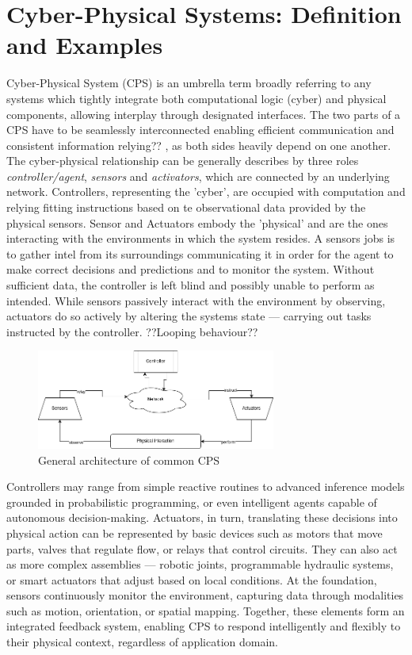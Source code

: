 \documentclass[11pt]{report}
\begin{document}
\section{Cyber-Physical Systems: Definition and Examples}

Cyber-Physical System (CPS) is an umbrella term broadly referring to any systems which tightly integrate both computational logic (cyber) and physical components, allowing interplay
through designated interfaces. \cite{cpsModelDesc} The two parts of a CPS have to be seamlessly interconnected enabling efficient communication and consistent information
 relying?? \cite{cpsChallengesAndFuture}, as both sides heavily depend on one another.
The cyber-physical relationship can be generally describes by three roles \textit{controller/agent}, \textit{sensors} and \textit{activators},
which are connected by an underlying network.
Controllers, representing the 'cyber', are occupied with computation and relying fitting instructions based on te observational data provided by the physical sensors.
Sensor and Actuators embody the 'physical' and are the ones interacting with the environments in which the system resides. A sensors jobs is to gather intel from its
surroundings communicating it in order for the agent to make correct decisions and predictions and to monitor the system. Without sufficient data, the controller is left
blind and possibly  unable to perform as intended. While sensors passively interact with the environment by observing, actuators do so actively by altering the systems state
 — carrying out tasks instructed by the controller.
  ??Looping behaviour??

\begin{figure}[htbp]
  \centering
  \includegraphics[width=0.7\textwidth]{graphics/cpsGeneralArchitecture.png}
  \caption{General architecture of common CPS}
  \label{fig:cps_architecture}
\end{figure}


Controllers may range from simple reactive routines to advanced inference models grounded in probabilistic programming, or even intelligent agents capable of autonomous
decision-making. Actuators, in turn, translating these decisions into physical action can be represented by basic devices such as motors that move parts, 
valves that regulate flow, or relays that control circuits. They can also act as more complex assemblies — robotic joints, programmable hydraulic systems, or smart actuators 
that adjust based on local conditions. At the foundation, sensors continuously monitor the environment, capturing data through modalities such as motion, 
orientation, or spatial mapping. Together, these elements form  an integrated feedback system, enabling CPS to respond intelligently and flexibly to their physical context,
regardless of application domain.\\
\end{document}
